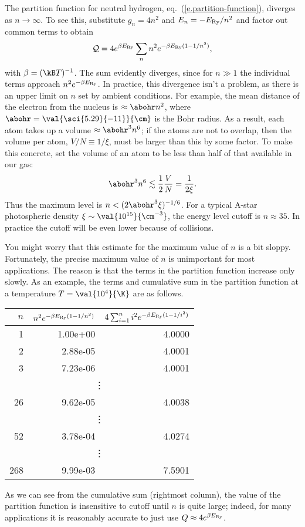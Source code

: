 \begin{sidebar}
\label{sb.partition-function}
The partition function for neutral hydrogen, eq.~(\ref{e.partition-function}), diverges as $n\to\infty$. To see this, substitute $g_{n}=4n^{2}$ and $E_{n} = -E_{\mathrm{Ry}}/n^{2}$ and factor out common terms to obtain
\[	\mathcal{Q} = 4e^{\beta E_{\mathrm{Ry}}}\sum_{n} n^{2} e^{-\beta E_{\mathrm{Ry}}(1-1/n^{2})}, \]
with $\beta = (\kB T)^{-1}$. The sum evidently diverges, since for $n\gg 1$ the individual terms approach $n^{2}e^{-\beta E_{\mathrm{Ry}}}$. In practice, this divergence isn't a problem, as there is an upper limit on $n$ set by ambient conditions. For example, the mean distance of the electron from the nucleus is $\approx \abohr n^{2}$, where $\abohr = \val{\sci{5.29}{-11}}{\cm}$ is the Bohr radius. As a result, each atom takes up a volume $\approx \abohr^{3}n^{6}$; if the atoms are not to overlap, then the volume per atom, $V/N \equiv 1/\xi$, must be larger than this by some factor. To make this concrete, set the volume of an atom to be less than half of that available in our gas:
\[
\abohr^{3}n^{6} \lesssim \frac{1}{2}\frac{V}{N} = \frac{1}{2\xi}.
\]
Thus the maximum level is $n < (2\abohr^{3}\xi)^{-1/6}$. For a typical A-star photospheric density $\xi\sim \val{10^{15}}{\cm^{-3}}$, the energy level cutoff is $n \approx 35$. In practice the cutoff will be even lower because of collisions.

You might worry that this estimate for the maximum value of $n$ is a bit sloppy. Fortunately,
the precise maximum value of $n$ is unimportant for most applications. The reason is that the terms in the partition function increase only slowly. As an example, the terms and cumulative sum in the partition function at a temperature $T=\val{10^{4}}{\K}$ are as follows.
\begin{center}
\begin{tabular}{rrr}
$n$ & $n^{2} e^{-\beta E_{\mathrm{Ry}}(1-1/n^{2})}$ & $4\sum_{i=1}^{n} i^{2}e^{-\beta E_{\mathrm{Ry}}(1-1/i^{2})}$ \\
\hline
   1 & 1.00e+00 &  4.0000 \\
   2 & 2.88e-05 &  4.0001 \\
   3 & 7.23e-06 &  4.0001 \\
  \multicolumn{3}{c}{\vdots} \\
  26 & 9.62e-05 &  4.0038 \\
  \multicolumn{3}{c}{\vdots} \\
  52 & 3.78e-04 &  4.0274 \\
  \multicolumn{3}{c}{\vdots} \\
 268 & 9.99e-03 &  7.5901 \\
\end{tabular}
\end{center}
As we can see from the cumulative sum (rightmost column), the value of the partition function is insensitive to cutoff until $n$ is quite large; indeed, for many applications it is reasonably accurate to just use $Q\approx 4e^{\beta E_{\mathrm{Ry}}}$. 
\end{sidebar}

